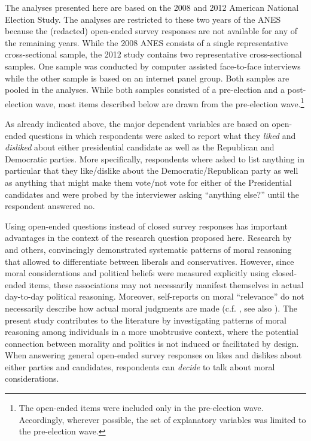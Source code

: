 \documentclass[12pt]{article}
\begin{document}
The analyses presented here are based on the 2008 and 2012 American National Election Study. The analyses are restricted to these two years of the ANES because the (redacted) open-ended survey responses are not available for any of the remaining years. While the 2008 ANES consists of a single representative cross-sectional sample, the 2012 study contains two representative cross-sectional samples. One sample was conducted by computer assisted face-to-face interviews while the other sample is based on an internet panel group. Both samples are pooled in the analyses. While both samples consisted of a pre-election and a post-election wave, most items described below are drawn from the pre-election wave.\footnote{The open-ended items were included only in the pre-election wave. Accordingly, wherever possible, the set of explanatory variables was limited to the pre-election wave.}

As already indicated above, the major dependent variables are based on open-ended questions in which respondents were asked to report what they \textit{liked} and \textit{disliked} about either presidential candidate as well as the Republican and Democratic parties. More specifically, respondents where asked to list anything in particular that they like/dislike about the Democratic/Republican party as well as anything that might make them vote/not vote for either of the Presidential candidates and were probed by the interviewer asking ``anything else?'' until the respondent answered no.

Using open-ended questions instead of closed survey responses has important advantages in the context of the research question proposed here. Research by \citet{graham2009liberals} and others, convincingly demonstrated systematic patterns of moral reasoning that allowed to differentiate between liberals and conservatives. However, since moral considerations and political beliefs were measured explicitly using closed-ended items, these associations may not necessarily manifest themselves in actual day-to-day political reasoning. Moreover, self-reports on moral ``relevance'' do not necessarily describe how actual moral judgments are made (c.f. \citealt[1031]{graham2009liberals}, see also \citealt{clifford2015moral}). The present study contributes to the literature by investigating patterns of moral reasoning among individuals in a more unobtrusive context, where the potential connection between morality and politics is not induced or facilitated by design. When answering general open-ended survey responses on likes and dislikes about either parties and candidates, respondents can \textit{decide} to talk about moral considerations.
\end{document}
